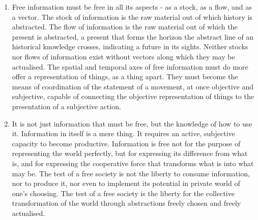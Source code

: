 \documentclass[letterpaper,12pt,english]{sphinxmanual}
\begin{document}
\begin{enumerate}
\item {} 
Free information must be free in all its aspects - as a stock, as a flow, and as a vector. The stock of information is the raw material out of which history is abstracted. The flow of information is the raw material out of which the present is abstracted, a present that forms the horizon the abstract line of an historical knowledge crosses, indicating a future in its sights. Neither stocks nor flows of information exist without vectors along which they may be actualised. The spatial and temporal axes of free information must do more offer a representation of things, as a thing apart. They must become the means of coordination of the statement of a movement, at once objective and subjective, capable of connecting the objective representation of things to the presentation of a subjective action.

\item {} 
It is not just information that must be free, but the knowledge of how to use it. Information in itself is a mere thing. It requires an active, subjective capacity to become productive. Information is free not for the purpose of representing the world perfectly, but for expressing its difference from what is, and for expressing the cooperative force that transforms what is into what may be. The test of a free society is not the liberty to consume information, nor to produce it, nor even to implement its potential in private world of one's choosing. The test of a free society is the liberty for the collective transformation of the world through abstractions freely chosen and freely actualised.

\end{enumerate}
\end{document}
